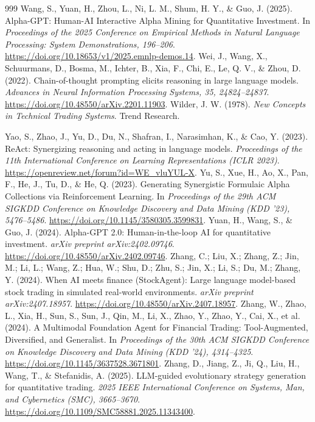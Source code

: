 \documentclass[analytics,article,submit,pdftex,moreauthors]{Definitions/mdpi}
\begin{document}
\begin{thebibliography}{999}
 Wang, S., Yuan, H., Zhou, L., Ni, L. M., Shum, H. Y., \& Guo, J. (2025). Alpha-GPT: Human-AI Interactive Alpha Mining for Quantitative Investment. In \emph{Proceedings of the 2025 Conference on Empirical Methods in Natural Language Processing: System Demonstrations, 196--206}. \url{https://doi.org/10.18653/v1/2025.emnlp-demos.14}.
 Wei, J., Wang, X., Schuurmans, D., Bosma, M., Ichter, B., Xia, F., Chi, E., Le, Q. V., \& Zhou, D. (2022). Chain-of-thought prompting elicits reasoning in large language models. \emph{Advances in Neural Information Processing Systems, 35, 24824--24837}. \url{https://doi.org/10.48550/arXiv.2201.11903}.
 Wilder, J. W. (1978). \emph{New Concepts in Technical Trading Systems}. Trend Research.

 Yao, S., Zhao, J., Yu, D., Du, N., Shafran, I., Narasimhan, K., \& Cao, Y. (2023). ReAct: Synergizing reasoning and acting in language models. \emph{Proceedings of the 11th International Conference on Learning Representations (ICLR 2023)}. \url{https://openreview.net/forum?id=WE_vluYUL-X}.
 Yu, S., Xue, H., Ao, X., Pan, F., He, J., Tu, D., \& He, Q. (2023). Generating Synergistic Formulaic Alpha Collections via Reinforcement Learning. In \emph{Proceedings of the 29th ACM SIGKDD Conference on Knowledge Discovery and Data Mining (KDD '23), 5476--5486}. \url{https://doi.org/10.1145/3580305.3599831}.
 Yuan, H., Wang, S., \& Guo, J. (2024). Alpha-GPT 2.0: Human-in-the-loop AI for quantitative investment. \emph{arXiv preprint arXiv:2402.09746}. \url{https://doi.org/10.48550/arXiv.2402.09746}.
 Zhang, C.; Liu, X.; Zhang, Z.; Jin, M.; Li, L.; Wang, Z.; Hua, W.; Shu, D.; Zhu, S.; Jin, X.; Li, S.; Du, M.; Zhang, Y. (2024). When AI meets finance (StockAgent): Large language model-based stock trading in simulated real-world environments. \emph{arXiv preprint arXiv:2407.18957}. \url{https://doi.org/10.48550/arXiv.2407.18957}.
 Zhang, W., Zhao, L., Xia, H., Sun, S., Sun, J., Qin, M., Li, X., Zhao, Y., Zhao, Y., Cai, X., et al. (2024). A Multimodal Foundation Agent for Financial Trading: Tool-Augmented, Diversified, and Generalist. In \emph{Proceedings of the 30th ACM SIGKDD Conference on Knowledge Discovery and Data Mining (KDD '24), 4314--4325}. \url{https://doi.org/10.1145/3637528.3671801}.
 Zhang, D., Jiang, Z., Ji, Q., Liu, H., Wang, T., \& Stefanidis, A. (2025). LLM-guided evolutionary strategy generation for quantitative trading. \emph{2025 IEEE International Conference on Systems, Man, and Cybernetics (SMC), 3665--3670}. \url{https://doi.org/10.1109/SMC58881.2025.11343400}.

\end{thebibliography}
\end{document}
